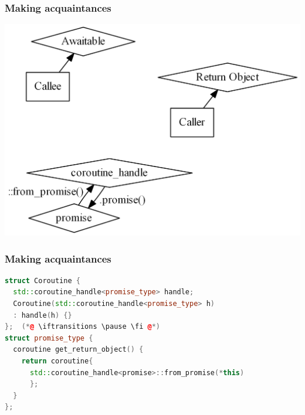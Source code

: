 \documentclass[aspectratio=169]{beamer}
\newif\iftransitions
\begin{document}
\begin{frame}[fragile]
  \frametitle{Making acquaintances}
  
  \begin{center}
  \includegraphics[height=.9\textheight]{pipelinesgfx/acquaintances01.png}
  \end{center}
\end{frame}

\begin{frame}[fragile]
  \frametitle{Making acquaintances}

  \begin{lstlisting}[language={C++}]
struct Coroutine {
  std::coroutine_handle<promise_type> handle;
  Coroutine(std::coroutine_handle<promise_type> h)
  : handle(h) {}
};  (*@ \iftransitions \pause \fi @*)
struct promise_type {
  coroutine get_return_object() {
    return coroutine{
      std::coroutine_handle<promise>::from_promise(*this)
      };
  }
};
  \end{lstlisting}
\end{frame}
\end{document}
